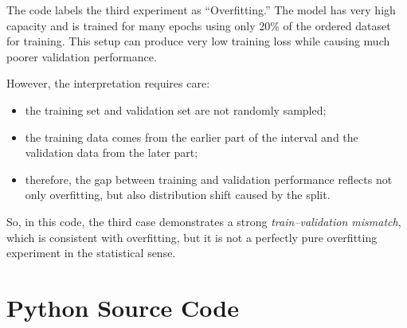 \documentclass[11pt]{article}
\begin{document}
The code labels the third experiment as ``Overfitting.'' The model has very high capacity and is trained for many epochs using only 20\% of the ordered dataset for training. This setup can produce very low training loss while causing much poorer validation performance.

However, the interpretation requires care:
\begin{itemize}
    \item the training set and validation set are not randomly sampled;
    \item the training data comes from the earlier part of the interval and the validation data from the later part;
    \item therefore, the gap between training and validation performance reflects not only overfitting, but also distribution shift caused by the split.
\end{itemize}

So, in this code, the third case demonstrates a strong \emph{train--validation mismatch}, which is consistent with overfitting, but it is not a perfectly pure overfitting experiment in the statistical sense.

\appendix
\section{Python Source Code}
\end{document}
